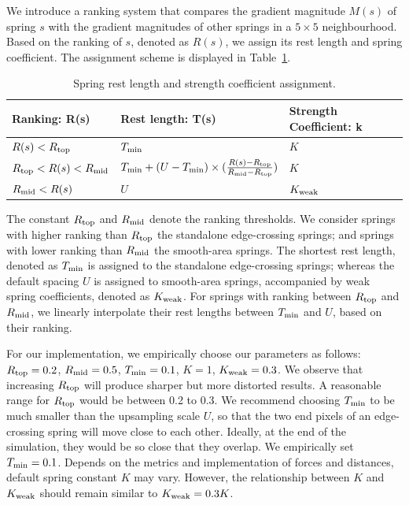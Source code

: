 We introduce a ranking system that compares the gradient magnitude $M(s)$ of spring $s$ with the gradient magnitudes of other springs in a $5\times 5$ neighbourhood. Based on the ranking of $s$, denoted as $R(s)$, we assign its rest length and spring coefficient. The assignment scheme is displayed in Table~\ref{table:1}.
 
\begin{table}[h!]
\centering
\begin{tabular}{ | l | l | l |} 
\hline Ranking: R(s) & Rest length: T(s) &  Strength Coefficient: k  \\ 
\hline $R(s)<R_{\rm top}$ & $T_{\rm min}$ & $K$ \\ 
\hline $R_{\rm top}<R(s)<R_{\rm mid}$ & $T_{\rm min} + (U-T_{\rm min})\times(\frac{R(s)-R_{\rm top}}{R_{\rm mid}-R_{\rm top}})$ & $K$ \\ 
\hline $R_{\rm mid}<R(s)$ & $U$ & $K_{\rm weak}$ \\ \hline 
\end{tabular} 
\caption{Spring rest length and strength coefficient assignment.}
\label{table:1}
\end{table}

The constant $R_{\rm top}$ and $R_{\rm mid}$ denote the ranking thresholds. We consider springs with higher ranking than $R_{\rm top}$ the standalone edge-crossing springs; and springs with lower ranking than $R_{\rm mid}$ the smooth-area springs. The shortest rest length, denoted as $T_{\rm min}$ is assigned to the standalone edge-crossing springs; whereas the default spacing $U$ is assigned to smooth-area springs, accompanied by weak spring coefficients, denoted as $K_{\rm weak}$. For springs with ranking between $R_{\rm top}$ and $R_{\rm mid}$, we linearly interpolate their rest lengths between $T_{\rm min}$ and $U$, based on their ranking.

For our implementation, we empirically choose our parameters as follows: $R_{\rm top} = 0.2$, $R_{\rm mid} = 0.5$, $T_{\rm min} = 0.1$, $K = 1$, $K_{\rm weak} = 0.3$. We observe that increasing $R_{\rm top}$ will produce sharper but more distorted results. A reasonable range for $R_{\rm top}$ would be between 0.2 to 0.3. We recommend choosing $T_{\rm min}$ to be much smaller than the upsampling scale $U$, so that the two end pixels of an edge-crossing spring will move close to each other. Ideally, at the end of the simulation, they would be so close that they overlap. We empirically set $T_{\rm min} = 0.1$. Depends on the metrics and implementation of forces and distances, default spring constant $K$ may vary. However, the relationship between $K$ and $K_{\rm weak}$ should remain similar to $K_{\rm weak} = 0.3K$.

